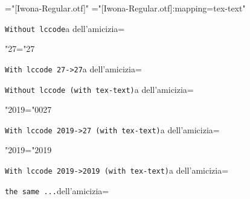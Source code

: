 \font\fontA="[Iwona-Regular.otf]"
\font\fontB="[Iwona-Regular.otf]:mapping=tex-text"



\newdimen\savehsize
\savehsize\hsize

\def\test#1#2{{\tt#1}\endgraf\hsize=3pt\noindent #2\endgraf\hsize=\savehsize}

\def\testA#1{\test{#1}{a dell'amicizia}}
\def\testB#1{\test{#1}{dell'amicizia}}

\fontA

\testA{Without lccode}

\lccode"27="27

\testA{With lccode 27->27}

\testA{Without lccode (with tex-text)}

\lccode"2019="0027

\testA{With lccode 2019->27 (with tex-text)}

\lccode"2019="2019

\testA{With lccode 2019->2019 (with tex-text)}

\testB{the same ...}

\bye
